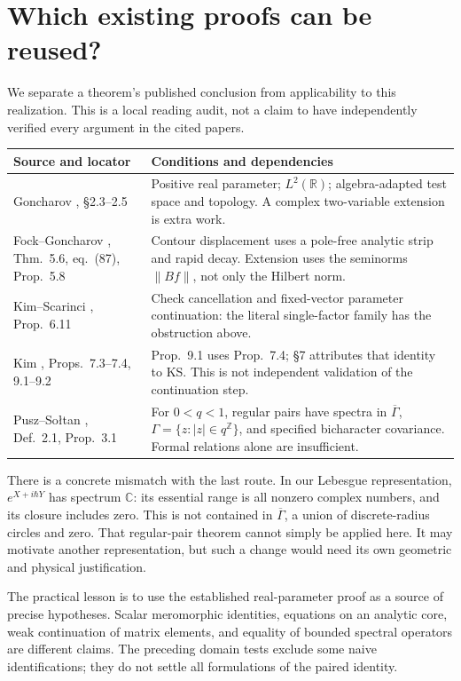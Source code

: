 \documentclass[11pt,a4paper]{article}
\begin{document}
\newpage
\section{Which existing proofs can be reused?}
We separate a theorem's published conclusion from applicability to this
realization. This is a local reading audit, not a claim
to have independently verified every argument in the cited papers.
\begin{center}\small
\begin{tabular}{p{.27\linewidth}p{.63\linewidth}}
\toprule
Source and locator & Conditions and dependencies\\
\midrule
Goncharov \cite{gon}, \S2.3--2.5 &
Positive real parameter; $L^2(\mathbb R)$; algebra-adapted test space
and topology. A complex two-variable extension is extra work.\\[4pt]
Fock--Goncharov \cite{fg}, Thm.~5.6, eq.~(87), Prop.~5.8 &
Contour displacement uses a pole-free analytic strip and rapid decay.
Extension uses the seminorms $\|Bf\|$, not only the Hilbert norm.\\[4pt]
Kim--Scarinci \cite{ks}, Prop.~6.11 &
Check cancellation and fixed-vector parameter continuation:
the literal single-factor family has the obstruction above.\\[4pt]
Kim \cite{pseudo}, Props.~7.3--7.4, 9.1--9.2 &
Prop.~9.1 uses Prop.~7.4; \S7 attributes that identity to KS.
This is not independent validation of the continuation step.\\[4pt]
Pusz--So{\l}tan \cite{ps}, Def.~2.1, Prop.~3.1 &
For $0<q<1$, regular pairs have spectra in
$\overline\Gamma$, $\Gamma=\{z:|z|\in q^{\mathbb Z}\}$, and specified
bicharacter covariance. Formal relations alone are insufficient.\\
\bottomrule
\end{tabular}
\end{center}
There is a concrete mismatch with the last route.
In our Lebesgue representation, $e^{X+i\hbar Y}$
has spectrum $\mathbb C$: its essential range is all nonzero complex
numbers, and its closure includes zero. This is not contained in
$\overline\Gamma$, a union of discrete-radius circles and zero.
That regular-pair theorem cannot simply be applied here.
It may motivate another representation, but such a change would need
its own geometric and physical justification.

The practical lesson is to use the established real-parameter proof
as a source of precise hypotheses. Scalar meromorphic identities,
equations on an analytic core, weak continuation of matrix
elements, and equality of bounded spectral operators are different claims.
The preceding domain tests exclude some naive identifications; they do
not settle all formulations of the paired identity.
\end{document}
